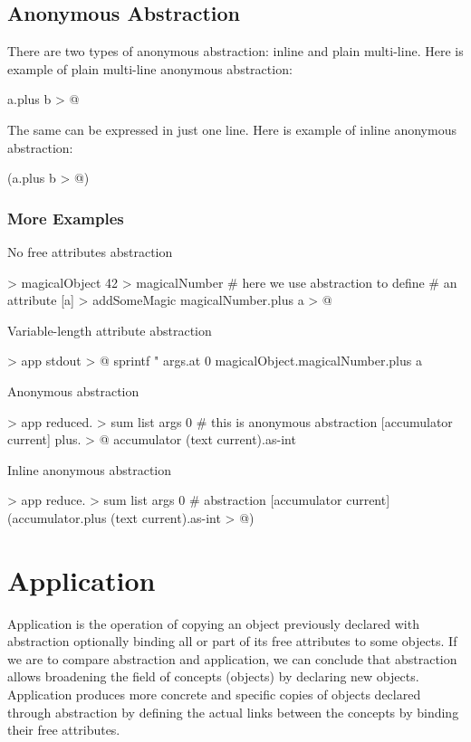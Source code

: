 \documentclass[12pt]{book}
\begin{document}
\subsection{Anonymous Abstraction} \label{subsec:anonymous-abstracion}
There are two types of anonymous abstraction: inline and plain multi-line. Here is example of plain multi-line anonymous abstraction:

\begin{ffcode}
[a b]
  a.plus b > @
\end{ffcode}
The same can be expressed in just one line. Here is example of inline anonymous abstraction:

\begin{ffcode}
[a b] (a.plus b > @)
\end{ffcode}

\subsubsection{More Examples}

No free attributes abstraction
\begin{ffcode}
[] > magicalObject
  42 > magicalNumber
  # here we use abstraction to define 
  # an attribute
  [a] > addSomeMagic
    magicalNumber.plus a > @
\end{ffcode}
Variable-length attribute abstraction
\begin{ffcode}
[args...] > app
  stdout > @
    sprintf
      "\n%
      args.at 0
      magicalObject.magicalNumber.plus a
\end{ffcode}
Anonymous abstraction
\begin{ffcode}
[args...] > app
  reduced. > sum
    list args
    0
    # this is anonymous abstraction
    [accumulator current]
      plus. > @
        accumulator
        (text current).as-int
\end{ffcode}
Inline anonymous abstraction
\begin{ffcode}
[args...] > app
  reduce. > sum
    list args
    0
    # abstraction
    [accumulator current] (accumulator.plus (text current).as-int > @)
\end{ffcode}

\section{Application} \label{sec:application}
Application is the operation of copying an object previously declared with abstraction optionally binding all or part of its free attributes to some objects.
If we are to compare abstraction and application, we can conclude that abstraction allows broadening the field of concepts (objects) by declaring new objects. Application produces more concrete and specific copies of objects declared through abstraction by defining the actual links between the concepts by binding their free attributes.
\end{document}
